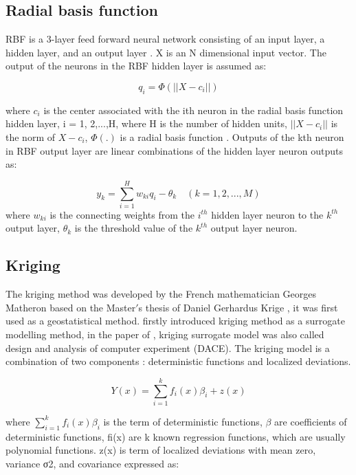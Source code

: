 \subsection{Radial basis function}
RBF is a 3-layer feed forward neural network consisting of an input layer, a hidden layer, and an output layer \cite{shen2011forecasting}. X is an N dimensional input vector. The output of the neurons in the RBF hidden layer is assumed as:

\begin{equation}
q_{i} = \varPhi(|| X - c_{i} ||)
\end{equation}

where $ c_{i} $ is the center associated with the ith neuron in the radial basis function hidden layer, i = 1, 2,...,H, where H is the number of hidden units, $ || X - c_{i} || $ is the norm of $ X − c_{i} $, $ \varPhi (.) $ is a radial basis function \cite{chen1991orthogonal}. Outputs of the kth neuron in RBF output layer are linear combinations of the hidden layer neuron outputs as:

\begin{equation}
	y_{k} = \sum_{i=1}^{H} w_{ki} q_{i} - \theta _{k} \quad (k = 1, 2,...,M)
\end{equation}
where $ w_{ki} $ is the connecting weights from the $ i^{th} $ hidden layer neuron to the $ k^{th} $ output layer, $ \theta _{k} $ is the threshold value of the $ k^{th} $ output layer neuron.

\subsection{Kriging}
The kriging method was developed by the French mathematician Georges Matheron based on the Master$ ' $s thesis of Daniel Gerhardus Krige \cite{matheron1963principles}, it was first used as a geostatistical method. \cite{sacks1989design} firstly introduced kriging method as a surrogate modelling method, in the paper of \cite{sacks1989design}, kriging surrogate model was also called design and analysis of computer experiment (DACE). The kriging model is a combination of two components \cite{queipo2005surrogate}: deterministic functions and localized deviations.

\begin{equation}
Y(x) = \sum_{i=1}^{k} f_{i} (x) \beta _{i} + z(x)
\end{equation}

where $ \sum_{i=1}^{k} f_{i} (x) \beta _{i} $ is the term of deterministic functions, $ \beta$ are coefficients of deterministic functions, fi(x) are k known regression functions, which are usually polynomial functions. z(x) is term of localized deviations with mean zero, variance σ2, and covariance expressed as:

